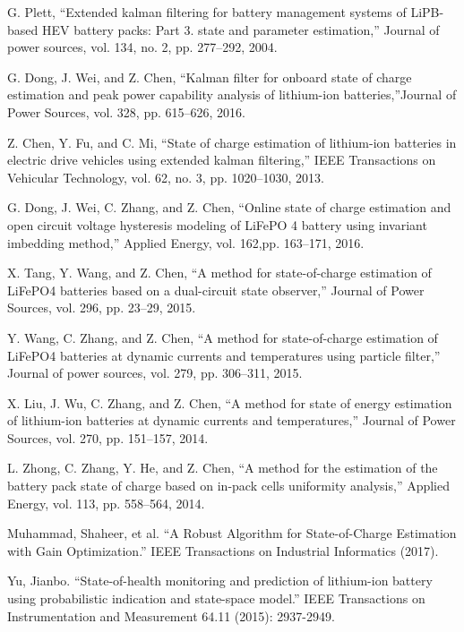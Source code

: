 G. Plett, ``Extended  kalman  filtering  for  battery  management  systems  of LiPB-based HEV battery  packs:  Part  3.  state  and  parameter  estimation,'' Journal of power sources, vol. 134, no. 2, pp. 277–292, 2004.

 G. Dong, J. Wei, and Z. Chen, ``Kalman filter for onboard state of charge estimation and peak power capability analysis of lithium-ion batteries,''Journal of Power Sources, vol. 328, pp. 615–626, 2016.

Z.  Chen,  Y.  Fu,  and  C.  Mi,  ``State  of  charge  estimation  of  lithium-ion batteries in electric drive vehicles using extended kalman filtering,'' IEEE Transactions  on  Vehicular  Technology,  vol.  62,  no.  3,  pp.  1020–1030, 2013.

 G.  Dong,  J.  Wei,  C.  Zhang,  and  Z.  Chen,  ``Online  state  of  charge estimation  and  open  circuit  voltage  hysteresis  modeling  of  LiFePO  4 battery  using  invariant  imbedding  method,'' Applied  Energy,  vol.  162,pp. 163–171, 2016.

  X. Tang, Y. Wang, and Z. Chen, ``A method for state-of-charge estimation of LiFePO4 batteries based  on a dual-circuit state observer,'' Journal of Power Sources, vol. 296, pp. 23–29, 2015.

  Y.  Wang,  C.  Zhang,  and  Z.  Chen,  ``A  method  for  state-of-charge estimation  of  LiFePO4  batteries  at  dynamic  currents  and  temperatures using particle filter,'' Journal of power sources, vol. 279, pp. 306–311, 2015.

  X.  Liu,  J.  Wu,  C.  Zhang,  and  Z.  Chen,  ``A  method  for  state  of energy  estimation  of  lithium-ion  batteries  at  dynamic  currents and temperatures,'' Journal of Power Sources, vol. 270, pp. 151–157, 2014.

  L. Zhong, C. Zhang, Y. He, and Z. Chen, ``A method for the estimation  of  the  battery  pack  state  of  charge  based  on  in-pack  cells  uniformity analysis,'' Applied Energy, vol. 113, pp. 558–564, 2014.
  
  Muhammad, Shaheer, et al. ``A Robust Algorithm for State-of-Charge Estimation with Gain Optimization.'' IEEE Transactions on Industrial Informatics (2017).

Yu, Jianbo. ``State-of-health monitoring and prediction of lithium-ion battery using probabilistic indication and state-space model.'' IEEE Transactions on Instrumentation and Measurement 64.11 (2015): 2937-2949.

